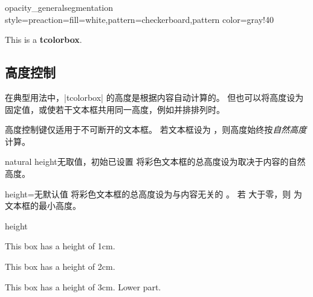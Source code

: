 \begin{exdispExample*}{opacity_general}{segmentation style={preaction={fill=white},pattern=checkerboard,pattern color=gray!40}}
\begin{tcolorbox}[enhanced jigsaw,fonttitle=\bfseries,title=This is a title,
  opacityframe=0.5,opacityback=0.25,opacitybacktitle=0.25,opacitytext=0.8,
  colback=red!5!white,colframe=red!75!black,colbacktitle=yellow!20!red]
This is a \textbf{tcolorbox}.
\end{tcolorbox}
\end{exdispExample*}



\clearpage
\subsection{高度控制}\label{sec:heightcontrol}
在典型用法中，|tcolorbox| 的高度是根据内容自动计算的。
但也可以将高度设为固定值，或使若干文本框共用同一高度，例如并排排列时。

\bigskip
\begin{marker}
  高度控制键仅适用于不可断开的文本框。
  若文本框设为 ，则高度始终按\emph{自然高度}计算。
\end{marker}
\bigskip


\begin{docTcbKey}{natural height}{}{无取值，初始已设置}
  将彩色文本框的总高度设为取决于内容的自然高度。
\end{docTcbKey}

\begin{docTcbKey}{height}{=}{无默认值}
  将彩色文本框的总高度设为与内容无关的 。
  若  大于零，则  为文本框的最小高度。
\begin{exdispExample}{height}

\begin{tcolorbox}[height=1cm,valign=center]
  This box has a height of 1cm.
\end{tcolorbox}
\begin{tcolorbox}[height=2cm,valign=center]
  This box has a height of 2cm.
\end{tcolorbox}
\begin{tcolorbox}[height=3cm,split=0.5,valign=center,valign lower=center]
  This box has a height of 3cm.
  \tcblower
  Lower part.
\end{tcolorbox}
\end{exdispExample}
\end{docTcbKey}

